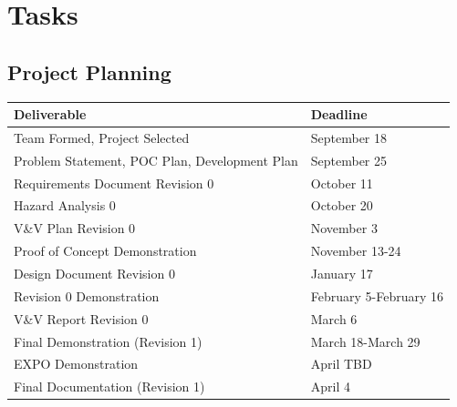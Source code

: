 \documentclass[12pt]{article}
\begin{document}
\section{Tasks}
\subsection{Project Planning}
\begin{table}[H]
    \begin{tabular}{|l|l|}
    \hline
    \textbf{Deliverable}                          & \textbf{Deadline}      \\ \hline
    Team Formed, Project Selected                 & September 18           \\ \hline
    Problem Statement, POC Plan, Development Plan & September 25           \\ \hline
    Requirements Document Revision 0              & October 11             \\ \hline
    Hazard Analysis 0                             & October 20             \\ \hline
    V\&V Plan Revision 0                          & November 3             \\ \hline
    Proof of Concept Demonstration                & November 13-24         \\ \hline
    Design Document Revision 0                    & January 17             \\ \hline
    Revision 0 Demonstration                      & February 5-February 16 \\ \hline
    V\&V Report Revision 0                        & March 6                \\ \hline
    Final Demonstration (Revision 1)              & March 18-March 29      \\ \hline
    EXPO Demonstration                            & April TBD              \\ \hline
    Final Documentation (Revision 1)              & April 4                \\ \hline
    \end{tabular}
\end{table}
\end{document}
